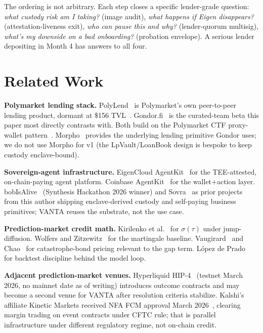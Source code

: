 \documentclass[11pt,letterpaper]{article}
\begin{document}
The ordering is not arbitrary. Each step closes a specific lender-grade question: \emph{what custody risk am I taking?} (image audit), \emph{what happens if Eigen disappears?} (attestation-liveness exit), \emph{who can pause this and why?} (lender-quorum multisig), \emph{what's my downside on a bad onboarding?} (probation envelope). A serious lender depositing in Month 4 has answers to all four.

\section{Related Work}
\label{sec:related}

\textbf{Polymarket lending stack.} PolyLend~\cite{polylend} is Polymarket's own peer-to-peer lending product, dormant at \$156 TVL~\cite{polylend-tvl}. Gondor.fi~\cite{gondor-docs,gondor-seed} is the curated-team beta this paper most directly contrasts with. Both build on the Polymarket CTF proxy-wallet pattern~\cite{polymarket-proxy}. Morpho~\cite{morpho} provides the underlying lending primitive Gondor uses; we do not use Morpho for v1 (the LpVault/LoanBook design is bespoke to keep custody enclave-bound).

\textbf{Sovereign-agent infrastructure.} EigenCloud AgentKit~\cite{eigenagentkit} for the TEE-attested, on-chain-paying agent platform. Coinbase AgentKit~\cite{coinbaseagentkit} for the wallet+action layer. bobIsAlive~\cite{bobisalive} (Synthesis Hackathon 2026 winner) and Sovra~\cite{sovra} as prior projects from this author shipping enclave-derived custody and self-paying business primitives; VANTA reuses the substrate, not the use case.

\textbf{Prediction-market credit math.} Kirilenko et al.~\cite{kirilenko2025} for $\sigma(\tau)$ under jump-diffusion. Wolfers and Zitzewitz~\cite{wolfers-zitzewitz} for the martingale baseline. Vaugirard~\cite{vaugirard2003} and Chao~\cite{chao2018} for catastrophe-bond pricing relevant to the gap term. L\'opez de Prado~\cite{lopezprado} for backtest discipline behind the model loop.

\textbf{Adjacent prediction-market venues.} Hyperliquid HIP-4~\cite{hyperliquid-hip4} (testnet March 2026, no mainnet date as of writing) introduces outcome contracts and may become a second venue for VANTA after resolution criteria stabilize. Kalshi's affiliate Kinetic Markets received NFA FCM approval March 2026~\cite{kalshi-fcm}, clearing margin trading on event contracts under CFTC rule; that is parallel infrastructure under different regulatory regime, not on-chain credit.
\end{document}
